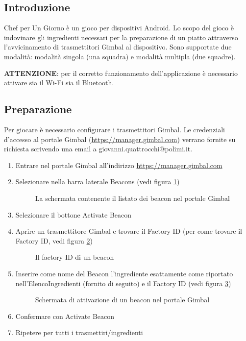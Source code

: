 \subsection{Introduzione}
Chef per Un Giorno è un gioco per dispositivi Android. Lo scopo del gioco è indovinare gli ingredienti necessari per la preparazione di un piatto attraverso l’avvicinamento di trasmettitori Gimbal al dispositivo. Sono supportate due modalità: modalità singola (una squadra) e modalità multipla (due squadre).

\textbf{ATTENZIONE}: per il corretto funzionamento dell’applicazione è necessario attivare sia il Wi-Fi sia il Bluetooth.

\subsection{Preparazione}

Per giocare è necessario configurare i trasmettitori Gimbal. Le credenziali d’accesso al portale Gimbal (\url{https://manager.gimbal.com}) verrano fornite su richiesta scrivendo una email a giovanni.quattrocchi@polimi.it.

\begin{enumerate}
\item Entrare nel portale Gimbal all’indirizzo \url{https://manager.gimbal.com}
\item Selezionare nella barra laterale Beacons (vedi figura \ref{fig:beacons})

\begin{figure}[h!]
\caption{La schermata contenente il listato dei beacon nel portale Gimbal}
\label{fig:beacons}
\end{figure}

\item Selezionare il bottone Activate Beacon
\item Aprire un trasmettitore Gimbal e trovare il Factory ID (per come trovare il Factory ID, vedi figura \ref{fig:factoryid})

\begin{figure}[h!]
\caption{Il factory ID di un beacon}
\label{fig:factoryid}
\end{figure}

\item Inserire come nome del Beacon l’ingrediente esattamente come riportato nell’ElencoIngredienti (fornito di seguito) e il Factory ID (vedi figura \ref{fig:activate-beacon})

\begin{figure}[h!]
\caption{Schermata di attivazione di un beacon nel portale Gimbal}
\label{fig:activate-beacon}
\end{figure}

\item Confermare con Activate Beacon
\item Ripetere per tutti i trasmettiri/ingredienti
\end{enumerate}

